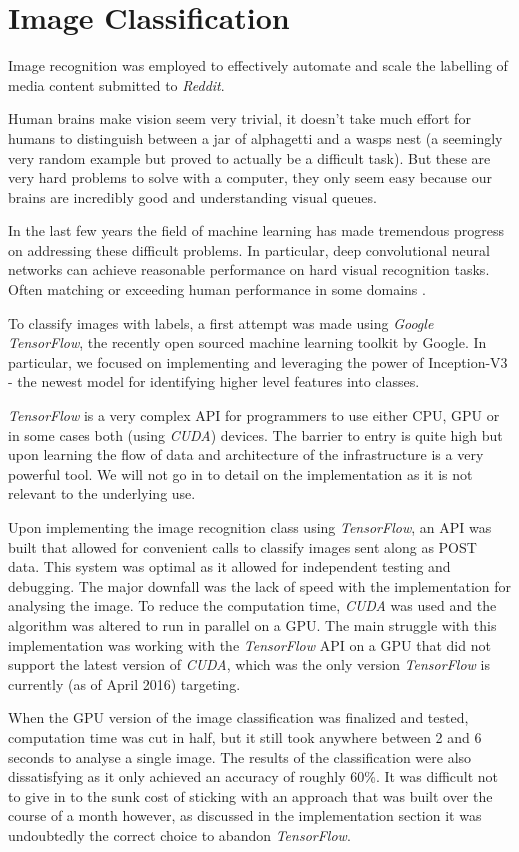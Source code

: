 \documentclass[msc,oneside]{ubcthesis}%
\begin{document}
\section{Image Classification}
Image recognition was employed to effectively automate and scale the labelling of media content submitted to \textit{Reddit}.
\par
Human brains make vision seem very trivial, it doesn't take much effort for humans to distinguish between a jar of alphagetti and a wasps nest (a seemingly very random example but proved to actually be a difficult task). But these are very hard problems to solve with a computer, they only seem easy because our brains are incredibly good and understanding visual queues. 
\par
In the last few years the field of machine learning has made tremendous progress on addressing these difficult problems. In particular, deep convolutional neural networks can achieve reasonable performance on hard visual recognition tasks. Often matching or exceeding human performance in some domains \citep{TensorFlow}.
\par
To classify images with labels, a first attempt was made using \textit{Google TensorFlow}, the recently open sourced machine learning toolkit by Google. In particular, we focused on implementing and leveraging the power of Inception-V3 \citep{DBLP:journals/corr/SzegedyVISW15} - the newest model for identifying higher level features into classes.
\par
\textit{TensorFlow} is a very complex API for programmers to use either CPU, GPU or in some cases both (using \textit{CUDA}) devices. The barrier to entry is quite high but upon learning the flow of data and architecture of the infrastructure is a very powerful tool. We will not go in to detail on the implementation as it is not relevant to the underlying use.
\par
Upon implementing the image recognition class using \textit{TensorFlow}, an API was built that allowed for convenient calls to classify images sent along as POST data. This system was optimal as it allowed for independent testing and debugging. The major downfall was the lack of speed with the implementation for analysing the image. To reduce the computation time, \textit{CUDA} was used and the algorithm was altered to run in parallel on a GPU. The main struggle with this implementation was working with the \textit{TensorFlow} API on a GPU that did not support the latest version of \textit{CUDA}, which was the only version \textit{TensorFlow} is currently (as of April 2016) targeting. 
\par
When the GPU version of the image classification was finalized and tested, computation time was cut in half, but it still took anywhere between 2 and 6 seconds to analyse a single image. The results of the classification were also dissatisfying as it only achieved an accuracy of roughly 60\%. It was difficult not to give in to the sunk cost of sticking with an approach that was built over the course of a month however, as discussed in the implementation section it was undoubtedly the correct choice to abandon \textit{TensorFlow}.
\end{document}
